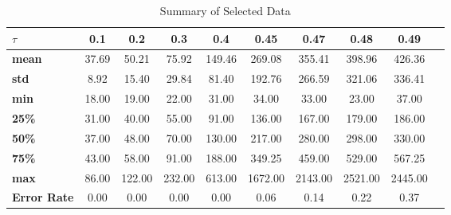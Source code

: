 \documentclass[magisterska, english]{pwr_wmat_praca_dyplomowa}
\theoremstyle{plain}
\numberwithin{theorem}{chapter}
\theoremstyle{definition}
\numberwithin{theorem}{chapter}
\begin{document}
\begin{table}
	\caption{Summary of Selected Data}
	\label{tab:selected_data_summary}
	\begin{tabular}{l*{9}{c}}
		\hline \hline
		\textbf{$\tau$} & 0.1 & 0.2& 0.3& 0.4 & 0.45 & 0.47 & 0.48 & 0.49 \\
		\hline
		\textbf{mean} & 37.69 & 50.21 & 75.92 & 149.46 & 269.08 & 355.41 & 398.96 & 426.36 \\
		\textbf{std} & 8.92 & 15.40 & 29.84 & 81.40 & 192.76 & 266.59 & 321.06 & 336.41 \\
		\textbf{min} & 18.00 & 19.00 & 22.00 & 31.00 & 34.00 & 33.00 & 23.00 & 37.00 \\
		\textbf{25\%} & 31.00 & 40.00 & 55.00 & 91.00 & 136.00 & 167.00 & 179.00 & 186.00 \\
		\textbf{50\%} & 37.00 & 48.00 & 70.00 & 130.00 & 217.00 & 280.00 & 298.00 & 330.00 \\
		\textbf{75\%} & 43.00 & 58.00 & 91.00 & 188.00 & 349.25 & 459.00 & 529.00 & 567.25 \\
		\textbf{max} & 86.00 & 122.00 & 232.00 & 613.00 & 1672.00 & 2143.00 & 2521.00 & 2445.00 \\
		\textbf{Error Rate} & 0.00 & 0.00 & 0.00 & 0.00 & 0.06 & 0.14 & 0.22 & 0.37 \\
		\hline \hline
	\end{tabular}
\end{table}



\end{document}
